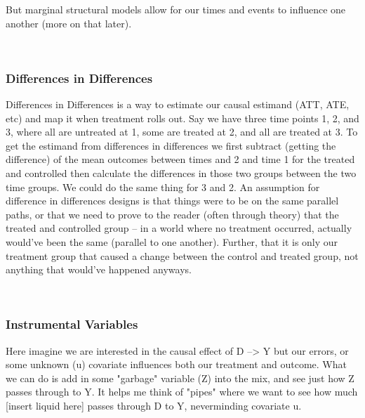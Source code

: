 \documentclass[12pt]{article}\usepackage[]{graphicx}\usepackage[]{color}
\begin{document}
\begin{flushleft}
\noindent But marginal structural models allow for our times and events to influence one another (more on that later).


\hfill \\

\subsubsection{Differences in Differences}
Differences in Differences is a way to estimate our causal estimand (ATT, ATE, etc) and map it when treatment rolls out. Say we have three time points 1, 2, and 3, where all are untreated at 1, some are treated at 2, and all are treated at 3. To get the estimand from differences in differences we first subtract (getting the difference) of the mean outcomes between times and 2 and time 1 for the treated and controlled then calculate the differences in those two groups between the two time groups. We could do the same thing for 3 and 2. An assumption for difference in differences designs is that things were to be on the same parallel paths, or that we need to prove to the reader (often through theory) that the treated and controlled group -- in a world where no treatment occurred, actually would've been the same (parallel to one another). Further, that it is only our treatment group that caused a change between the control and treated group, not anything that would've happened anyways.

\hfill \\

\subsubsection{Instrumental Variables}

Here imagine we are interested in the causal effect of D --> Y but our errors, or some unknown (u) covariate influences both our treatment and outcome. What we can do is add in some "garbage" variable (Z) into the mix, and see just how Z passes through to Y. It helps me think of "pipes" where we want to see how much [insert liquid here] passes through D to Y, neverminding covariate u.

\begin{center}
\end{center}
\hfill




\end{flushleft}
\end{document}
